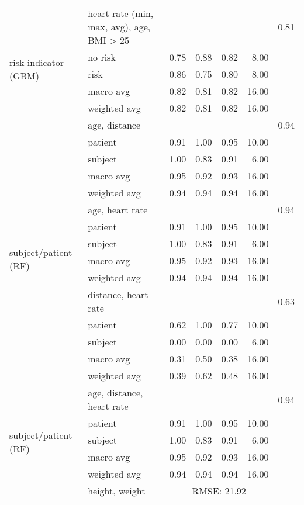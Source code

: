 \begin{longtable}{llrrrrr}
    \midrule
    \multirow{6}{*}{risk indicator (GBM)} 
    & heart rate (min, max, avg), age, BMI > 25 & & & & & 0.81 \\
    & no risk & 0.78 & 0.88 & 0.82 & 8.00 & \\
    & risk & 0.86 & 0.75 & 0.80 & 8.00 & \\
    & macro avg & 0.82 & 0.81 & 0.82 & 16.00 & \\
    & weighted avg & 0.82 & 0.81 & 0.82 & 16.00 & \\
    \midrule
    \multirow{6}{*}{subject/patient (RF)} 
    & age, distance & & & & & 0.94 \\
    & patient & 0.91 & 1.00 & 0.95 & 10.00 & \\
    & subject & 1.00 & 0.83 & 0.91 & 6.00 & \\
    & macro avg & 0.95 & 0.92 & 0.93 & 16.00 & \\
    & weighted avg & 0.94 & 0.94 & 0.94 & 16.00 & \\
    \midrule
    \multirow{6}{*}{subject/patient (RF)} 
    & age, heart rate & & & & & 0.94 \\
    & patient & 0.91 & 1.00 & 0.95 & 10.00 & \\
    & subject & 1.00 & 0.83 & 0.91 & 6.00 & \\
    & macro avg & 0.95 & 0.92 & 0.93 & 16.00 & \\
    & weighted avg & 0.94 & 0.94 & 0.94 & 16.00 & \\
    \midrule
    \multirow{6}{*}{subject/patient (RF)} 
    & distance, heart rate & & & & & 0.63 \\
    & patient & 0.62 & 1.00 & 0.77 & 10.00 & \\
    & subject & 0.00 & 0.00 & 0.00 & 6.00 & \\
    & macro avg & 0.31 & 0.50 & 0.38 & 16.00 & \\
    & weighted avg & 0.39 & 0.62 & 0.48 & 16.00 & \\
    \midrule
    \multirow{6}{*}{subject/patient (RF)} 
    & age, distance, heart rate & & & & & 0.94 \\
    & patient & 0.91 & 1.00 & 0.95 & 10.00 & \\
    & subject & 1.00 & 0.83 & 0.91 & 6.00 & \\
    & macro avg & 0.95 & 0.92 & 0.93 & 16.00 & \\
    & weighted avg & 0.94 & 0.94 & 0.94 & 16.00 & \\
    \midrule
    \multirow{4}{*}{heart rate prediction (LR)} 
    & height, weight & \multicolumn{4}{c}{RMSE: 21.92} & \\

\end{longtable}
